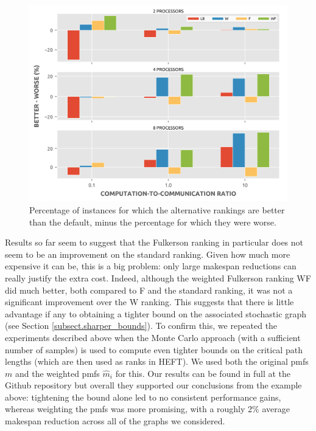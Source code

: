 \documentclass[12pt]{article}
\begin{document}
\begin{figure}
	\centering	
	\includegraphics[scale=0.8]{100tasks_differential.png}
	\caption{Percentage of instances for which the alternative rankings are better than the default, minus the percentage for which they were worse.}	
	\label{plot.rankings_diff_100}
      \end{figure}

Results so far seem to suggest that the Fulkerson ranking in particular does not seem to be an improvement on the standard ranking. Given how much more expensive it can be, this is a big problem: only large makespan reductions can really justify the extra cost. Indeed, although the weighted Fulkerson ranking WF did much better, both compared to F and the standard ranking, it was not a significant improvement over the W ranking. This suggests that there is little advantage if any to obtaining a tighter bound on the associated stochastic graph (see Section \ref{subsect.sharper_bounds}). To confirm this, we repeated the experiments described above when the Monte Carlo approach (with a sufficient number of samples) is used to compute even tighter bounds on the critical path lengths (which are then used as ranks in HEFT). We used both the original pmfs $m$ and the weighted pmfs $\hat{m}_i$ for this. Our results can be found in full at the Github repository but overall they supported our conclusions from the example above: tightening the bound alone led to no consistent performance gains, whereas weighting the pmfs was more promising, with a roughly $2\%$ average makespan reduction across all of the graphs we considered.       
\end{document}
